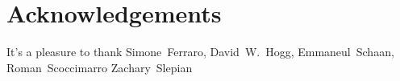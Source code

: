 \documentclass[12pt, letterpaper, preprint]{aastex}
\begin{document}
\section*{Acknowledgements}
It's a pleasure to thank 
    Simone~Ferraro,
    David~W.~Hogg,
    Emmaneul~Schaan, 
    Roman~Scoccimarro
    Zachary~Slepian



\end{document}
